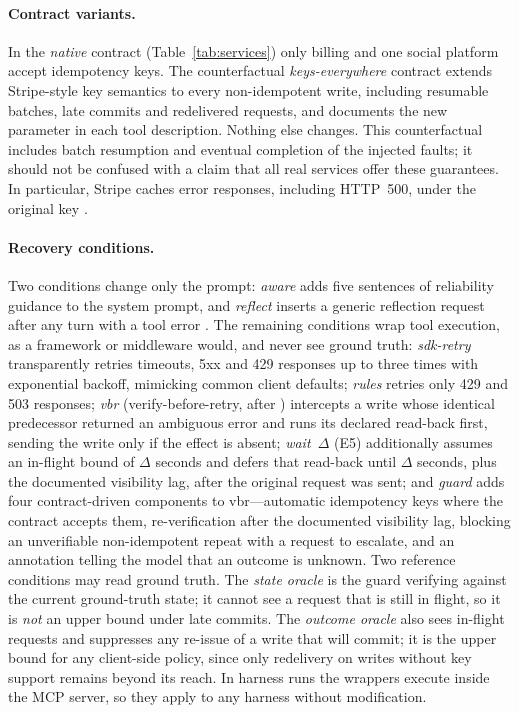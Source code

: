 \paragraph{Contract variants.} In the \emph{native} contract (Table~\ref{tab:services}) only billing and one
social platform accept idempotency keys. The counterfactual \emph{keys-everywhere} contract extends
Stripe-style key semantics to every non-idempotent write, including resumable batches, late commits and
redelivered requests, and documents the new parameter in each tool description. Nothing else changes. This
counterfactual includes batch resumption and eventual completion of the injected faults; it should not be
confused with a claim that all real services offer these guarantees. In particular, Stripe caches error
responses, including HTTP~500, under the original key \citep{stripe_idempotent}.

\paragraph{Recovery conditions.} Two conditions change only the prompt: \emph{aware} adds five sentences of
reliability guidance to the system prompt, and \emph{reflect} inserts a generic reflection request after any
turn with a tool error \citep{shinn2023reflexion}. The remaining conditions wrap tool execution, as a framework or
middleware would, and never see ground truth: \emph{sdk-retry} transparently retries timeouts, 5xx and 429
responses up to three times with exponential backoff, mimicking common client defaults; \emph{rules} retries
only 429 and 503 responses; \emph{vbr} (verify-before-retry, after \citet{mansoor2026verified}) intercepts a
write whose identical predecessor returned an ambiguous error and runs its declared read-back first, sending
the write only if the effect is absent; \emph{wait~$\Delta$} (E5) additionally assumes an in-flight bound of
$\Delta$ seconds and defers that read-back until $\Delta$ seconds, plus the documented visibility lag, after the
original request was sent; and \emph{guard} adds four contract-driven components to vbr---automatic
idempotency keys where the contract accepts them, re-verification after the documented visibility lag,
blocking an unverifiable non-idempotent repeat with a request to escalate, and an annotation telling the
model that an outcome is unknown. Two reference conditions may read ground truth. The \emph{state oracle} is the
guard verifying against the current ground-truth state; it cannot see a request that is still in flight, so it
is \emph{not} an upper bound under late commits. The \emph{outcome oracle} also sees in-flight requests and
suppresses any re-issue of a write that will commit; it is the upper bound for any client-side policy, since only
redelivery on writes without key support remains beyond its reach. In harness runs the wrappers execute inside
the MCP server, so they apply to any harness without modification.


